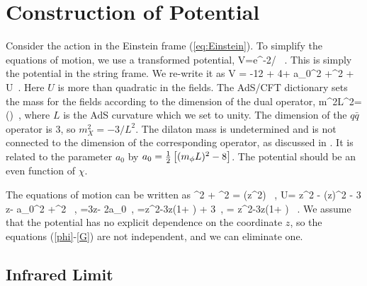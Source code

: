 \section{Construction of Potential}
\label{sec:potential}

Consider the action in the Einstein frame (\ref{eq:Einstein}).
To simplify the equations of motion, we use a transformed potential, 
\be
V=e^{-2\phi/} \, .
\label{transform}
\ee
This is simply the potential in the string frame.
We re-write it as
\be
V = -12 + 4\phi + a_0\phi^2 +\chi^2 + U \,.
\label{V}
\ee
Here $U$ is more than quadratic in the fields. 
 The AdS/CFT dictionary sets the mass for the fields according to the dimension of the dual operator,
\be
m^2L^2=\Delta() \,,
\ee
where $L$ is the AdS curvature which we set to unity.  The dimension of the $q\bar{q}$ operator is 3, so $m_X^2 = -3/L^2$.
The dilaton mass is undetermined and is not connected to the dimension of the corresponding operator, as discussed in \cite{Springer2010}.  
It is related to the parameter $a_0$ by $a_0 = \thalf \left[ \mL2-8 \right]$. 
The potential should be an even function of $\chi$. 

The equations of motion can be written as
\be
\chidot^2 + \Gdot^2 =  \Dz(z^2\phidot) \, ,
\label{C}
\ee
\be
U=\thalf {} z^2 \phiddot - \tthalf (z\phidot)^2 - 3  z\phi - a_0\phi^2 +\tthalf\chi^2 \, ,
\label{U}
\ee
\be
 =3z\phidot - 2a_0\phi \, ,
\label{phi}
\ee
\be
=z^2\chiddot -3z\chidot \left(1+ \right) + 3\chi \, ,
\label{chi}
\ee
\be
 =
z^2\Gddot -3z\Gdot \left(1+ \right) \, .
\label{G}
\ee
We assume that the potential has no explicit dependence on the coordinate $z$,  so the equations (\ref{phi}-\ref{G}) are not independent, and we can eliminate one. 

\subsection{Infrared Limit}

